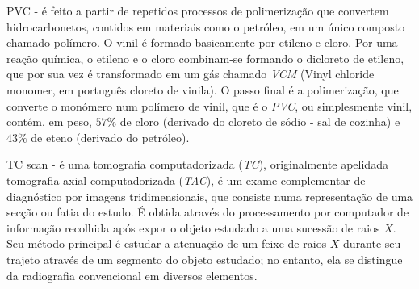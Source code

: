 \begin{glossario}
\item[PVC] - é feito a partir de repetidos processos de polimerização que convertem hidrocarbonetos, contidos em materiais como o petróleo, em um único composto chamado polímero. O vinil é formado basicamente por etileno e cloro. Por uma reação química, o etileno e o cloro combinam-se formando o dicloreto de etileno, que por sua vez é transformado em um gás chamado \emph{VCM} (Vinyl chloride monomer, em português cloreto de vinila). O passo final é a polimerização, que converte o monómero num polímero de vinil, que é o \emph{PVC}, ou simplesmente vinil, contém, em peso, $57\%$ de cloro (derivado do cloreto de sódio - sal de cozinha) e $43\%$ de eteno (derivado do petróleo).

\item[TC scan] - é uma tomografia computadorizada (\emph{TC}), originalmente apelidada tomografia axial computadorizada (\emph{TAC}), é um exame complementar de diagnóstico por imagens tridimensionais, que consiste numa representação de uma secção ou fatia do estudo. É obtida através do processamento por computador de informação recolhida após expor o objeto estudado a uma sucessão de raios $X$. Seu método principal é estudar a atenuação de um feixe de raios $X$ durante seu trajeto através de um segmento do objeto estudado; no entanto, ela se distingue da radiografia convencional em diversos elementos.

\end{glossario}

